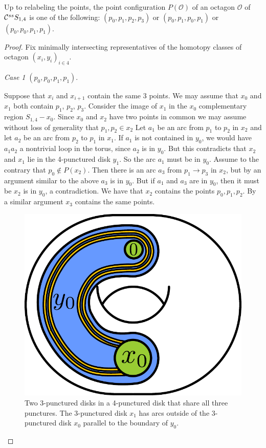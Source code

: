 \begin{lemma}
  Up to relabeling the points, the point configuration $P(\mathcal O)$ of an octagon $\mathcal O$ of $ \mathcal C^{{ss}}  S_{1,4}$
  is one of the following: $(p_0,p_1,p_2,p_3)$ or $(p_0,p_1,p_0,p_1)$ or $(p_0,p_0,p_1,p_1)$.
  \label{lemma:ptconfig}
\end{lemma}

\begin{proof}
Fix minimally intersecting representatives of the homotopy classes of octagon
$(x_i, y_i)_{i \in 4}$.

\emph{Case 1} $(p_0,p_0,p_1,p_1)$.

Suppose that  $x_i$ and $x_{i+1}$ contain the same 3 points.
We may assume that $x_0$ and $x_1$ both contain $p_1$, $p_2$, $p_3$.
Consider the image of $x_1$ in the $x_0$ complementary region  $S_{1,4}-x_0$.
Since $x_0$ and $x_2$ have two points in common we may assume
without loss of generality that $p_1,p_2 \in x_2$
Let $a_1$ be an arc from $p_1$ to $p_2$ in $x_2$ and let $a_2$ be an arc
from $p_2$ to $p_1$ in $x_1$.
If $a_1$ is not contained in $y_0$, we would have $a_1a_2$ a nontrivial loop in the
torus, since $a_2$ is in $y_0$.
But this contradicts that $x_2$ and $x_1$ lie in the 4-punctured
disk $y_1$. So the arc $a_1$ must be in $y_0$.
Assume to the contrary that $p_0 \notin P(x_2)$.
Then there is an arc  $a_3$ from $p_1 \to  p_3$
in $x_2$, but by an argument similar to the above $a_3$ is in $y_0$.
But  if $a_1$ and $a_3$ are in $y_0$, then it must be $x_2$ is in $y_0$, a contradiction.
We have that $x_2$ contains the points $p_0,p_1,p_2$.
By a similar argument $x_3$ contains the same points.

\begin{figure}[h!]
  \centering
  \includegraphics[width=.3\textwidth]{figures/outofx0.pdf}
  \caption{Two 3-punctured disks in a 4-punctured disk that share all three punctures. The 3-punctured disk $x_1$
  has arcs outside of the 3-punctured disk $x_0$ parallel to the boundary of $y_0$.}
  \label{fig:outofx0}
\end{figure}


\end{proof}
